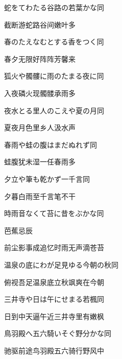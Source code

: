 \begin{haiku}
    {\FH 蛇をてわたる谷路の若葉かな}\hfill{\FH 同}

    {\FK 截断游蛇路谷间嫩叶多}
\end{haiku}

\begin{haiku}
    {\FH 春のたえなむとする香をつく}\hfill{\FH 同}

    {\FK 春夕无限好阵阵芳馨来}
\end{haiku}

\begin{haiku}
    {\FH 狐火や髑髏に雨のたまる夜に}\hfill{\FH 同}

    {\FK 入夜磷火现髑髅承雨多}
\end{haiku}

\begin{haiku}
    {\FH 夜水とる里人のこえや夏の月}\hfill{\FH 同}

    {\FK 夏夜月色里乡人汲水声}
\end{haiku}

\begin{haiku}
    {\FH 春雨や蛙の腹はまだぬれず}\hfill{\FH 同}

    {\FK 蛙腹犹未湿一任春雨多}
\end{haiku}

\begin{haiku}
    {\FH 夕立や筆も乾かず一千言}\hfill{\FH 同}

    {\FK 夕暮白雨至千言笔不干}
\end{haiku}

\begin{haiku}
    {\FH 時雨音なくて苔に昔をぶかな}\hfill{\FH 同}

    {\FK 芭蕉忌辰}

    {\FK 前尘影事成追忆时雨无声滴苍苔}
\end{haiku}

\begin{haiku}
    {\FH 温泉の底にわが足見ゆる今朝の秋}\hfill{\FH 同}

    {\FK 俯视吾足温泉底立秋飒爽在今朝}
\end{haiku}

\begin{haiku}
    {\FH 三井寺や日は午にせまる若楓}\hfill{\FH 同}

    {\FK 日到中天逼午近三井寺里有嫩枫}
\end{haiku}

\begin{haiku}
    {\FH 鳥羽殿へ五六騎いそぐ野分かな}\hfill{\FH 同}

    {\FK 驰驱前途鸟羽殿五六骑行野风中}
\end{haiku}

